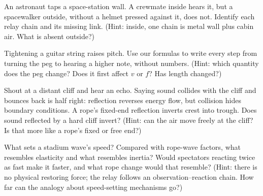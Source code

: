 \begin{puzzles}
  \item An astronaut taps a space-station wall. A crewmate inside hears it, but a spacewalker outside, without a helmet pressed against it, does not. Identify each relay chain and its missing link. (Hint: inside, one chain is metal wall plus cabin air. What is absent outside?)
  \item Tightening a guitar string raises pitch. Use our formulas to write every step from turning the peg to hearing a higher note, without numbers. (Hint: which quantity does the peg change? Does it first affect \(v\) or \(f\)? Has length changed?)
  \item Shout at a distant cliff and hear an echo. Saying sound collides with the cliff and bounces back is half right: reflection reverses energy flow, but collision hides boundary conditions. A rope's fixed-end reflection inverts crest into trough. Does sound reflected by a hard cliff invert? (Hint: can the air move freely at the cliff? Is that more like a rope's fixed or free end?)
  \item What sets a stadium wave's speed? Compared with rope-wave factors, what resembles elasticity and what resembles inertia? Would spectators reacting twice as fast make it faster, and what rope change would that resemble? (Hint: there is no physical restoring force; the relay follows an observation--reaction chain. How far can the analogy about speed-setting mechanisms go?)
\end{puzzles}
